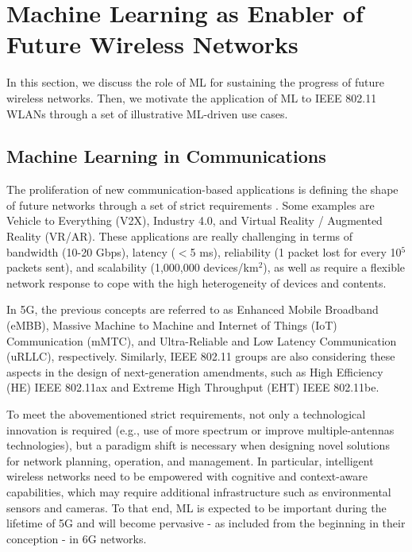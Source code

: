 \documentclass{article}
\begin{document}
\section{Machine Learning as Enabler of Future Wireless Networks} 
\label{section:intro_ML}
In this section, we discuss the role of ML for sustaining the progress of future wireless networks. Then, we motivate the application of ML to IEEE 802.11 WLANs through a set of illustrative ML-driven use cases.

\subsection{Machine Learning in Communications}
The proliferation of new communication-based applications is defining the shape of future networks through a set of strict requirements \cite{itu2019use}. Some examples are Vehicle to Everything (V2X), Industry 4.0, and Virtual Reality / Augmented Reality (VR/AR). These applications are really challenging in terms of bandwidth (10-20 Gbps), latency ($<$5 ms), reliability (1 packet lost for every 10$^5$ packets sent), and scalability (1,000,000 devices/km$^2$), as well as require a flexible network response to cope with the high heterogeneity of devices and contents.

In 5G, the previous concepts are referred to as Enhanced Mobile Broadband (eMBB), Massive Machine to Machine and Internet of Things (IoT) Communication (mMTC), and Ultra-Reliable and Low Latency Communication (uRLLC), respectively. Similarly, IEEE 802.11 groups are also considering these aspects in the design of next-generation amendments, such as High Efficiency (HE) IEEE 802.11ax and Extreme High Throughput (EHT) IEEE 802.11be.

To meet the abovementioned strict requirements, not only a technological innovation is required (e.g., use of more spectrum or improve multiple-antennas technologies), but a paradigm shift is necessary when designing novel solutions for network planning, operation, and management. In particular, intelligent wireless networks need to be empowered with cognitive and context-aware capabilities, which may require additional infrastructure such as environmental sensors and cameras. To that end, ML is expected to be important during the lifetime of 5G and will become pervasive - as included from the beginning in their conception - in 6G networks. 
\end{document}

